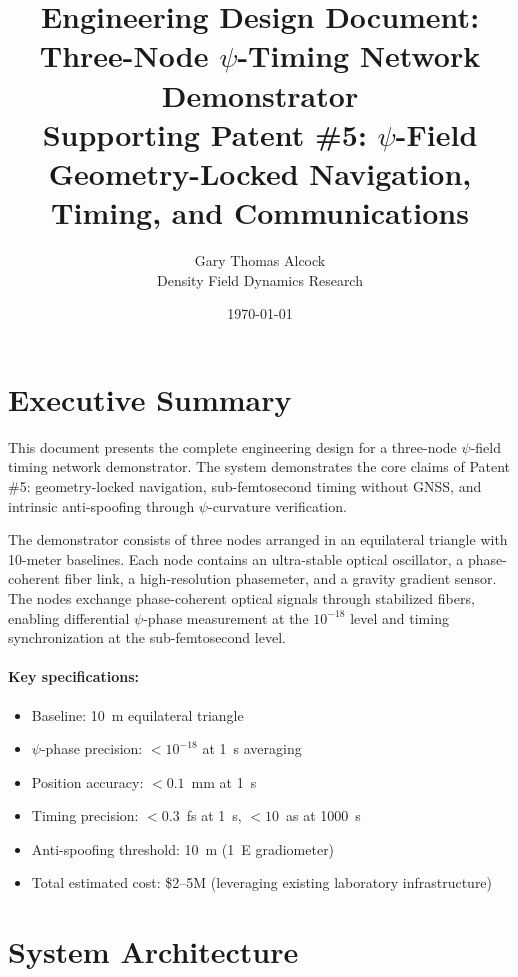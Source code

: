 \documentclass[12pt,letterpaper]{article}
\title{Engineering Design Document:\\
Three-Node $\psi$-Timing Network Demonstrator\\[10pt]
\large Supporting Patent \#5: $\psi$-Field Geometry-Locked Navigation,
Timing, and Communications}
\author{Gary Thomas Alcock\\
Density Field Dynamics Research}
\date{\today}
\begin{document}
\maketitle
\tableofcontents
\newpage

\section{Executive Summary}

This document presents the complete engineering design for a three-node
$\psi$-field timing network demonstrator. The system demonstrates the
core claims of Patent \#5: geometry-locked navigation, sub-femtosecond
timing without GNSS, and intrinsic anti-spoofing through $\psi$-curvature
verification.

The demonstrator consists of three nodes arranged in an equilateral
triangle with 10-meter baselines. Each node contains an ultra-stable
optical oscillator, a phase-coherent fiber link, a high-resolution
phasemeter, and a gravity gradient sensor. The nodes exchange
phase-coherent optical signals through stabilized fibers, enabling
differential $\psi$-phase measurement at the $10^{-18}$ level and
timing synchronization at the sub-femtosecond level.

\paragraph{Key specifications:}
\begin{itemize}[nosep]
\item Baseline: 10~m equilateral triangle
\item $\psi$-phase precision: $< 10^{-18}$ at 1~s averaging
\item Position accuracy: $< 0.1$~mm at 1~s
\item Timing precision: $< 0.3$~fs at 1~s, $< 10$~as at 1000~s
\item Anti-spoofing threshold: 10~m (1~E gradiometer)
\item Total estimated cost: \$2--5M (leveraging existing laboratory infrastructure)
\end{itemize}

\section{System Architecture}
\end{document}

